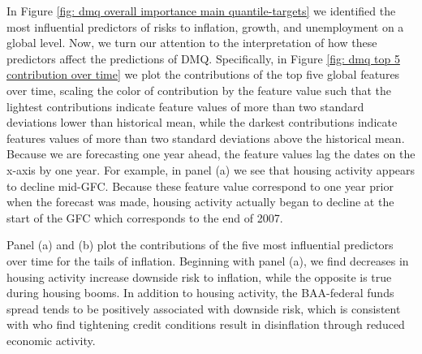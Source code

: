\documentclass[12pt]{article}
\begin{document}
In Figure \ref{fig: dmq overall importance main quantile-targets} we identified the most influential predictors of risks to inflation, growth, and unemployment on a global level. Now, we turn our attention to the interpretation of how these predictors affect the predictions of DMQ. Specifically, in Figure \ref{fig: dmq top 5 contribution over time} we plot the contributions of the top five global features over time, scaling the color of contribution by the feature value such that the lightest contributions indicate feature values of more than two standard deviations lower than historical mean, while the darkest contributions indicate features values of more than two standard deviations above the historical mean. Because we are forecasting one year ahead, the feature values lag the dates on the x-axis by one year. For example, in panel (a) we see that housing activity appears to decline mid-GFC. Because these feature value correspond to one year prior when the forecast was made, housing activity actually began to decline at the start of the GFC which corresponds to the end of 2007. 

Panel (a) and (b) plot the contributions of the five most influential predictors over time for the tails of inflation. Beginning with panel (a), we find decreases in housing activity increase downside risk to inflation, while the opposite is true during housing booms. In addition to housing activity, the BAA-federal funds spread tends to be positively associated with downside risk, which is consistent with \cite{gilchristCreditSpreadsBusiness2012} who find tightening credit conditions result in disinflation through reduced economic activity.

\end{document}
